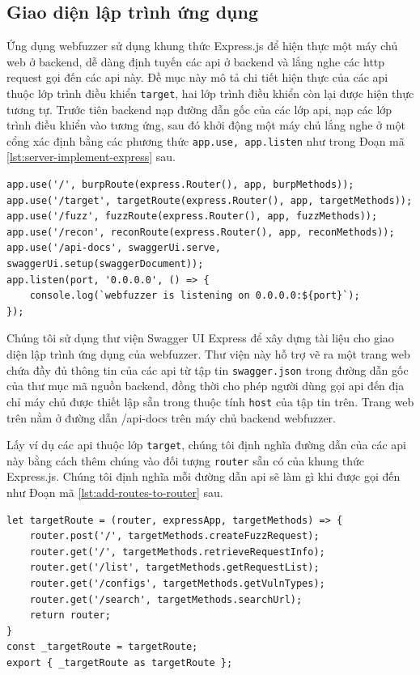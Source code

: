 \subsection{Giao diện lập trình ứng dụng}
Ứng dụng webfuzzer sử dụng khung thức Express.js để hiện thực một máy chủ web ở backend, dễ dàng định tuyến các \acrshort{api} ở backend và lắng nghe các \acrshort{http} request gọi đến các \acrshort{api} này. Đề mục này mô tả chi tiết hiện thực của các \acrshort{api} thuộc lớp trình điều khiển \texttt{target}, hai lớp trình điều khiển còn lại được hiện thực tương tự. Trước tiên backend nạp đường dẫn gốc của các lớp \acrshort{api}, nạp các lớp trình điều khiển vào tương ứng, sau đó khởi động một máy chủ lắng nghe ở một cổng xác định bằng các phương thức \texttt{app.use, app.listen} như trong Đoạn mã \ref{lst:server-implement-express} sau.
\begin{lstlisting}[style=ES6, label={lst:server-implement-express}, caption={Thiết lập đường dẫn gốc của các \acrshort{api} và khởi động backend}]
app.use('/', burpRoute(express.Router(), app, burpMethods));
app.use('/target', targetRoute(express.Router(), app, targetMethods));
app.use('/fuzz', fuzzRoute(express.Router(), app, fuzzMethods));
app.use('/recon', reconRoute(express.Router(), app, reconMethods));
app.use('/api-docs', swaggerUi.serve, swaggerUi.setup(swaggerDocument));
app.listen(port, '0.0.0.0', () => {
    console.log(`webfuzzer is listening on 0.0.0.0:${port}`);
});
\end{lstlisting}
Chúng tôi sử dụng thư viện Swagger UI Express để xây dựng tài liệu cho giao diện lập trình ứng dụng của webfuzzer. Thư viện này hỗ trợ vẽ ra một trang web chứa đầy đủ thông tin của các \acrshort{api} từ tập tin \texttt{swagger.json} trong đường dẫn gốc của thư mục mã nguồn backend, đồng thời cho phép người dùng gọi \acrshort{api} đến địa chỉ máy chủ được thiết lập sẵn trong thuộc tính \texttt{host} của tập tin trên. Trang web trên nằm ở đường dẫn \colorbox{gray!30}{/api-docs} trên máy chủ backend webfuzzer.\par
Lấy ví dụ các \acrshort{api} thuộc lớp \texttt{target}, chúng tôi định nghĩa đường dẫn của các \acrshort{api} này bằng cách thêm chúng vào đối tượng \texttt{router} sẵn có của khung thức Express.js. Chúng tôi định nghĩa mỗi đường dẫn \acrshort{api} sẽ làm gì khi được gọi đến như Đoạn mã \ref{lst:add-routes-to-router} sau.
\begin{lstlisting}[style=ES6, label={lst:add-routes-to-router}, caption={Định nghĩa đường dẫn cho các \acrshort{api} thuộc lớp target}]
let targetRoute = (router, expressApp, targetMethods) => {
    router.post('/', targetMethods.createFuzzRequest);
    router.get('/', targetMethods.retrieveRequestInfo);
    router.get('/list', targetMethods.getRequestList);
    router.get('/configs', targetMethods.getVulnTypes);
    router.get('/search', targetMethods.searchUrl);
    return router;
}
const _targetRoute = targetRoute;
export { _targetRoute as targetRoute };
\end{lstlisting}
